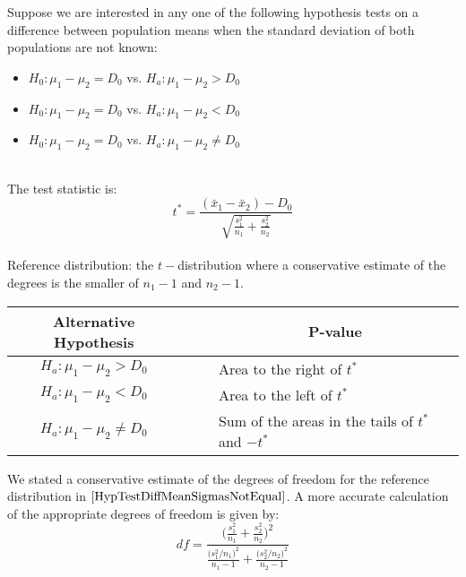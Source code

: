 \begin{hyp} \label{HypTestDiffMeanSigmasNotEqual}
Suppose we are interested in any one of the following hypothesis tests
on a difference between population means 
when the standard deviation of both populations are not known:\\

\begin{itemize}
\item	$H_{0} : \mu_{1} - \mu_{2}  = D_{0}$  vs. $H_{a}  : \mu_{1} - \mu_{2}  > D_{0}$
\item	$H_{0} : \mu_{1} - \mu_{2}  = D_{0}$  vs. $H_{a}  : \mu_{1} - \mu_{2}  < D_{0}$
\item	$H_{0} : \mu_{1} - \mu_{2}  = D_{0}$  vs. $H_{a}  : \mu_{1} - \mu_{2}  \neq D_{0}$
\end{itemize}

\hfill\\
The test statistic is:
\begin{equation}
t^{*}	= \displaystyle\frac{ ( \bar{x}_{1} - \bar{x}_{2} ) - D_{0} }{ \sqrt{ \displaystyle\frac{s_{1}^{2} }{n_{1}} 
+ \displaystyle\frac{s_{2}^{2} }{n_{2}}  } }
\end{equation}
\hfill\\
Reference distribution: the $t-$distribution where a conservative estimate of the degrees is the smaller of $n_{1} - 1$ and $n_{2} - 1$.\\

\begin{center}
\begin{tabular}{ccl}
Alternative Hypothesis	&	~\quad~	&	\multicolumn{1}{c}{P-value}	\\
\hline
$H_{a}  : \mu_{1} - \mu_{2}  > D_{0}$		&	&	Area to the right of $t^{*}$	\\
$H_{a}  : \mu_{1} - \mu_{2}  < D_{0}$		&	&	Area to the left of $t^{*}$	\\
$H_{a}  : \mu_{1} - \mu_{2}  \neq D_{0}$	&	&	Sum of the areas in the tails of $t^{*}$ and $-t^{*}$
\end{tabular}
\end{center}

\end{hyp}



\begin{nt}
We stated a conservative estimate of the degrees of freedom for the reference distribution 
in $\ref{HypTestDiffMeanSigmasNotEqual}$.
A more accurate calculation of the appropriate degrees of freedom is given by:
	\begin{equation}
	df = 	\displaystyle\frac{  \bigg( \displaystyle\frac{ s_{1}^2 }{ n_{1} } + \frac{ s_{2}^2 }{ n_{2} } \bigg)^{2}  }{
		\displaystyle\frac{ \big(  s_{1}^{2} / n_{1}  \big)^{2}  }{ n_{1} - 1}
		+
		\displaystyle\frac{ \big( s_{2}^{2} / n_{2 } \big)^{2}  }{n_{2} - 1}
		}
	\end{equation}
\end{nt}



